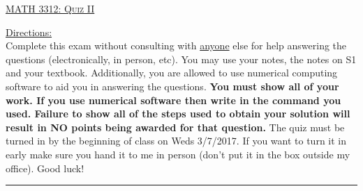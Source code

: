 \documentclass[10pt, a4paper]{article}
\theoremstyle{break}
\begin{document}
\begin{center}
{\large \textsc{\underline{MATH 3312: Quiz II}}}
\vspace{0.125in}
\end{center}
\underline{Directions:} \\
Complete this exam without consulting with \underline{anyone} else for help answering the questions (electronically, in person, etc). You may use your notes, the notes on S1 and your textbook. Additionally, you are allowed to use numerical computing software to aid you in answering the questions. \textbf{You must show all of your work. If you use numerical software then write in the command you used. Failure to show all of the steps used to obtain your solution will result in NO points being awarded for that question. } 
\noindent The quiz must be turned in by the beginning of class on Weds 3/7/2017. If you want to turn it in early make sure you hand it to me in person (don't put it in the box outside my office). Good luck! \\
\noindent\rule{15cm}{0.4pt}

\vspace{0.25in}
\end{document}
